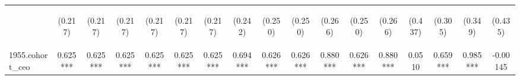 \begin{center}
\begin{tabular}{lcccccccccccccccc}
\vspace{4pt} & \begin{footnotesize}(0.217)\end{footnotesize} & \begin{footnotesize}(0.217)\end{footnotesize} & \begin{footnotesize}(0.217)\end{footnotesize} & \begin{footnotesize}(0.217)\end{footnotesize} & \begin{footnotesize}(0.217)\end{footnotesize} & \begin{footnotesize}(0.217)\end{footnotesize} & \begin{footnotesize}(0.242)\end{footnotesize} & \begin{footnotesize}(0.250)\end{footnotesize} & \begin{footnotesize}(0.250)\end{footnotesize} & \begin{footnotesize}(0.266)\end{footnotesize} & \begin{footnotesize}(0.250)\end{footnotesize} & \begin{footnotesize}(0.266)\end{footnotesize} & \begin{footnotesize}(0.437)\end{footnotesize} & \begin{footnotesize}(0.305)\end{footnotesize} & \begin{footnotesize}(0.349)\end{footnotesize} & \begin{footnotesize}(0.435)\end{footnotesize} \\
1955.cohort\_ceo & 0.625*** & 0.625*** & 0.625*** & 0.625*** & 0.625*** & 0.625*** & 0.694*** & 0.626*** & 0.626*** & 0.880*** & 0.626*** & 0.880*** & 0.0510 & 0.659*** & 0.985*** & -0.00145 \\

\end{tabular}
\end{center}
